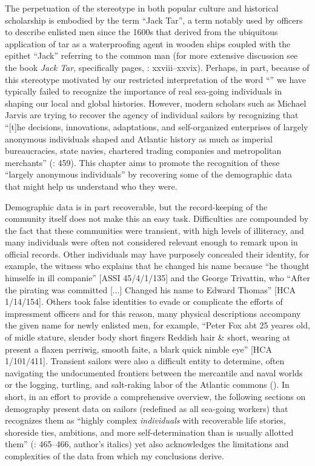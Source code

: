   The perpetuation of the  stereotype in both popular culture and historical scholarship is embodied by the term “Jack Tar”, a term notably used by officers to describe enlisted men since the 1600s that derived from the ubiquitous application of tar as a waterproofing agent in wooden ships coupled with the epithet “Jack” referring to the common man (for more extensive discussion see the book \textit{Jack Tar}, specifically pages, \citealt{AdkinsAdkins2008}: xxviii–xxvix). Perhaps, in part, because of this stereotype motivated by our restricted interpretation of the word “” we have typically failed to recognize the importance of real sea-going individuals in shaping our local and global histories. However, modern scholars such as Michael Jarvis are trying to recover the agency of individual sailors by recognizing that “[t]he decisions, innovations, adaptations, and self-organized enterprises of largely anonymous individuals shaped  and Atlantic history as much as imperial bureaucracies, state navies, chartered trading companies and metropolitan merchants” (\citealt{Jarvis2010}: 459). This chapter aims to promote the recognition of these “largely anonymous individuals” by recovering some of the demographic data that might help us understand who they were. 

Demographic data is in part recoverable, but the record-keeping of the community itself does not make this an easy task. Difficulties are compounded by the fact that these communities were transient, with high levels of illiteracy, and many individuals were often not considered relevant enough to remark upon in official records. Other individuals may have purposely concealed their identity, for example, the witness who explains that he changed his name because “he thought himselfe in ill companie” [ASSI 45/4/1/135] and the  George Trivattin, who “After the pirating was committed [...] Changed his name to Edward Thomas” [HCA 1/14/154]. Others took false identities to evade or complicate the efforts of impressment officers and for this reason, many physical descriptions accompany the given name for newly enlisted men, for example, “Peter Fox abt 25 yeares old, of midle stature, slender body short fingers Reddish hair \& short, wearing at present a flaxen perriwig, smooth faite, a blark quick nimble eye” [HCA 1/101/411]. Transient sailors were also a difficult entity to determine, often navigating the undocumented frontiers between the mercantile and naval worlds \citep{Fusaro2015} or the logging, turtling, and salt-raking labor of the Atlantic commons (\citealt{Jarvis2010}). In short, in an effort to provide a comprehensive overview, the following sections on demography present data on sailors (redefined as all sea-going workers) that recognizes them as “highly complex \textit{individuals} with recoverable life stories, shoreside ties, ambitions, and more self-determination than is usually allotted them” (\citealt{Jarvis2010}: 465–466, author’s italics) yet also acknowledges the limitations and complexities of the data from which my conclusions derive. 

